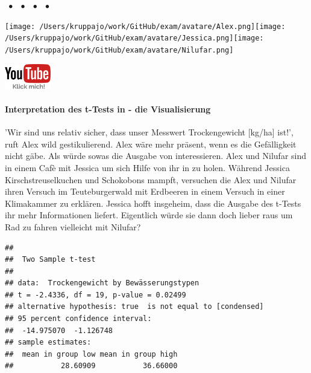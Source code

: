 \documentclass[a4paper, 9pt]{scrartcl}\usepackage[]{graphicx}\usepackage[]{xcolor}
\makeatletter
\newenvironment{kframe}{%
 \def\at@end@of@kframe{}%
 \ifinner\ifhmode%
  \def\at@end@of@kframe{\end{minipage}}%
  \begin{minipage}{\columnwidth}%
 \fi\fi%
 \def\FrameCommand##1{\hskip\@totalleftmargin \hskip-\fboxsep
 \colorbox{shadecolor}{##1}\hskip-\fboxsep
     \hskip-\linewidth \hskip-\@totalleftmargin \hskip\columnwidth}%
 \MakeFramed {\advance\hsize-\width
   \@totalleftmargin\z@ \linewidth\hsize
   \@setminipage}}%
 {\par\unskip\endMakeFramed%
 \at@end@of@kframe}
\newenvironment{knitrout}{}{} %
\makeatother
\begin{document}
 
\ifcollection
\begin{flushright}
\tiny\vspace{-3Ex}
\textbf{\examinhaltstart}
\exammodulemathstat $\;\bullet$
\exammodulestat $\;\bullet$
\exammodulestatbbv $\;\bullet$
\exammodulestatversuch $\;\bullet$
\exammodulebiostat
\vspace{-4Ex}
\end{flushright}
\begin{minipage}[t]{0.5\textwidth}
\texttt{[image: /Users/kruppajo/work/GitHub/exam/avatare/Alex.png]}\hspace{-4mm}\texttt{[image: /Users/kruppajo/work/GitHub/exam/avatare/Jessica.png]}\hspace{-4mm}\texttt{[image: /Users/kruppajo/work/GitHub/exam/avatare/Nilufar.png]}
\end{minipage}
\begin{minipage}[t]{0.5\textwidth}
\hfill
\href{https://youtu.be/w62HJlbN28U}{\includegraphics[width = 2cm]{img/youtube}}
\end{minipage}
\fi



\ifcollection
\paragraph{Interpretation des t-Tests in \Rlogo - die Visualisierung}
\fi

'Wir sind uns relativ sicher, dass unser Messwert Trockengewicht [kg/ha] ist!', ruft Alex wild gestikulierend. Alex wäre mehr präsent, wenn es die Gefälligkeit nicht gäbe. Als würde sowas die Ausgabe von \Rlogo interessieren. Alex und Nilufar sind in einem Cafè mit Jessica um sich Hilfe von ihr in \Rlogo zu holen. Während Jessica Kirschstreuselkuchen und Schokobons mampft, versuchen die Alex und Nilufar ihren Versuch im Teuteburgerwald mit Erdbeeren in einem Versuch in einer Klimakammer zu erklären. Jessica hofft insgeheim, dass die \Rlogo Ausgabe des t-Tests ihr mehr Informationen liefert. Eigentlich würde sie dann doch lieber raus um Rad zu fahren vielleicht mit Nilufar?

\begin{knitrout}
\color{fgcolor}\begin{kframe}
\begin{verbatim}
## 
## 	Two Sample t-test
## 
## data:  Trockengewicht by Bewässerungstypen
## t = -2.4336, df = 19, p-value = 0.02499
## alternative hypothesis: true  is not equal to [condensed]
## 95 percent confidence interval:
##  -14.975070  -1.126748
## sample estimates:
##  mean in group low mean in group high 
##           28.60909           36.66000
\end{verbatim}
\end{kframe}
\end{knitrout}
\end{document}

